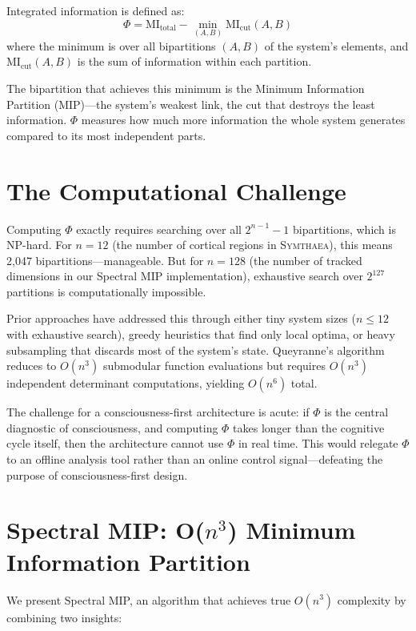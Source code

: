 \documentclass[12pt]{book}
\newcommand{\symthaea}{\textsc{Symthaea}}
\begin{document}
Integrated information is defined as:
\begin{equation}\label{eq:phi-def}
\Phi = \text{MI}_{\text{total}} - \min_{(A,B)} \text{MI}_{\text{cut}}(A, B)
\end{equation}
where the minimum is over all bipartitions $(A, B)$ of the system's elements, and $\text{MI}_{\text{cut}}(A, B)$ is the sum of information within each partition.

The bipartition that achieves this minimum is the Minimum Information Partition (MIP)---the system's weakest link, the cut that destroys the least information. $\Phi$ measures how much more information the whole system generates compared to its most independent parts.

\section{The Computational Challenge}

Computing $\Phi$ exactly requires searching over all $2^{n-1} - 1$ bipartitions, which is NP-hard. For $n = 12$ (the number of cortical regions in \symthaea{}), this means 2,047 bipartitions---manageable. But for $n = 128$ (the number of tracked dimensions in our Spectral MIP implementation), exhaustive search over $2^{127}$ partitions is computationally impossible.

Prior approaches have addressed this through either tiny system sizes ($n \leq 12$ with exhaustive search), greedy heuristics that find only local optima, or heavy subsampling that discards most of the system's state. Queyranne's algorithm reduces to $O(n^3)$ submodular function evaluations but requires $O(n^3)$ independent determinant computations, yielding $O(n^6)$ total.

The challenge for a consciousness-first architecture is acute: if $\Phi$ is the central diagnostic of consciousness, and computing $\Phi$ takes longer than the cognitive cycle itself, then the architecture cannot use $\Phi$ in real time. This would relegate $\Phi$ to an offline analysis tool rather than an online control signal---defeating the purpose of consciousness-first design.

\section{Spectral MIP: O($n^3$) Minimum Information Partition}

We present Spectral MIP, an algorithm that achieves true $O(n^3)$ complexity by combining two insights:
\end{document}
